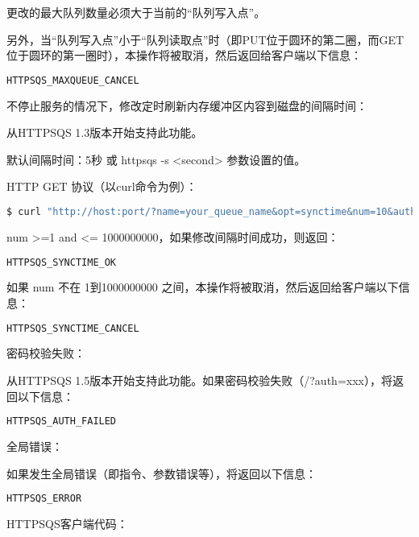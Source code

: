 更改的最大队列数量必须大于当前的“队列写入点”。


另外，当“队列写入点”小于“队列读取点”时（即PUT位于圆环的第二圈，而GET位于圆环的第一圈时），本操作将被取消，然后返回给客户端以下信息：



\begin{lstlisting}[language=bash]
HTTPSQS_MAXQUEUE_CANCEL
\end{lstlisting}


不停止服务的情况下，修改定时刷新内存缓冲区内容到磁盘的间隔时间：


从HTTPSQS 1.3版本开始支持此功能。

默认间隔时间：5秒 或 httpsqs -s <second> 参数设置的值。

HTTP GET 协议（以curl命令为例）：


\begin{lstlisting}[language=bash]
$ curl "http://host:port/?name=your_queue_name&opt=synctime&num=10&auth=mypass123"
\end{lstlisting}



num >=1 and <= 1000000000，如果修改间隔时间成功，则返回：


\begin{lstlisting}[language=bash]
HTTPSQS_SYNCTIME_OK
\end{lstlisting}


如果 num 不在 1到1000000000 之间，本操作将被取消，然后返回给客户端以下信息：



\begin{lstlisting}[language=bash]
HTTPSQS_SYNCTIME_CANCEL
\end{lstlisting}

密码校验失败：

从HTTPSQS 1.5版本开始支持此功能。如果密码校验失败（/?auth=xxx），将返回以下信息：

\begin{lstlisting}[language=bash]
HTTPSQS_AUTH_FAILED
\end{lstlisting}

全局错误：

如果发生全局错误（即指令、参数错误等），将返回以下信息：



\begin{lstlisting}[language=bash]
HTTPSQS_ERROR
\end{lstlisting}


HTTPSQS客户端代码：



